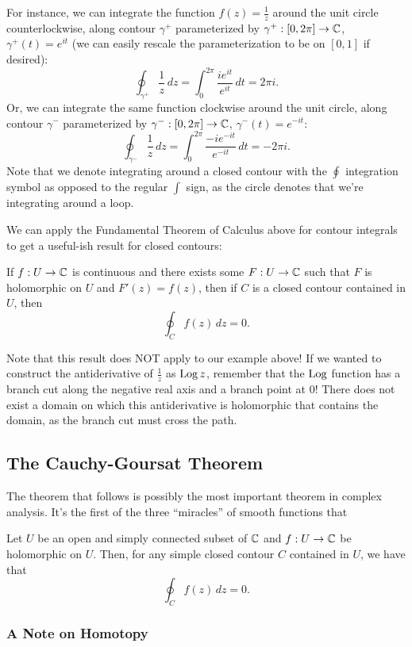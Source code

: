 For instance, we can integrate the function $f(z) = \frac 1z$ around the unit circle counterlockwise, along contour $\gamma^+$ parameterized by $\gamma^+ : [0, 2\pi] \to \mathbb C$, $\gamma^+(t) = e^{it}$ (we can easily rescale the parameterization to be on $[0,1]$ if desired):
\[ \oint_{\gamma^+} \frac 1z \, dz = \int_0^{2\pi} \frac{i e^{it}}{e^{it}} \, dt = 2\pi i.\]
Or, we can integrate the same function clockwise around the unit circle, along contour $\gamma^-$ parameterized by $\gamma^- : [0, 2\pi] \to \mathbb C$, $\gamma^-(t) = e^{-it}$:
\[ \oint_{\gamma^-} \frac 1z \, dz = \int_0^{2\pi} \frac{-i e^{-it}}{e^{-it}} \, dt = -2\pi i.\]
Note that we denote integrating around a closed contour with the $\oint$ integration symbol as opposed to the regular $\int$ sign, as the circle denotes that we're integrating around a loop.

We can apply the Fundamental Theorem of Calculus above for contour integrals to get a useful-ish result for closed contours:
\begin{corollary}
  If $f : U \to \mathbb C$ is continuous and there exists some $F : U \to \mathbb C$ such that $F$ is holomorphic on $U$ and $F'(z) = f(z)$, then if $C$ is a closed contour contained in $U$, then \[\oint_C f(z) \, dz = 0.\]
\end{corollary}
Note that this result does NOT apply to our example above! If we wanted to construct the antiderivative of $\frac 1z$ as $\operatorname*{Log} z$, remember that the $\operatorname*{Log}$ function has a branch cut along the negative real axis and a branch point at 0! There does not exist a domain on which this antiderivative is holomorphic that contains the domain, as the branch cut must cross the path.

\subsection{The Cauchy-Goursat Theorem}
The theorem that follows is possibly the most important theorem in complex analysis. It's the first of the three ``miracles'' of smooth functions that
\begin{theorem}
  Let $U$ be an open and simply connected subset of $\mathbb C$ and $f : U \to \mathbb C$ be holomorphic on $U$. Then, for any simple closed contour $C$ contained in $U$, we have that \[\oint_C f(z) \, dz = 0.\]
\end{theorem}

\subsubsection{A Note on Homotopy}


